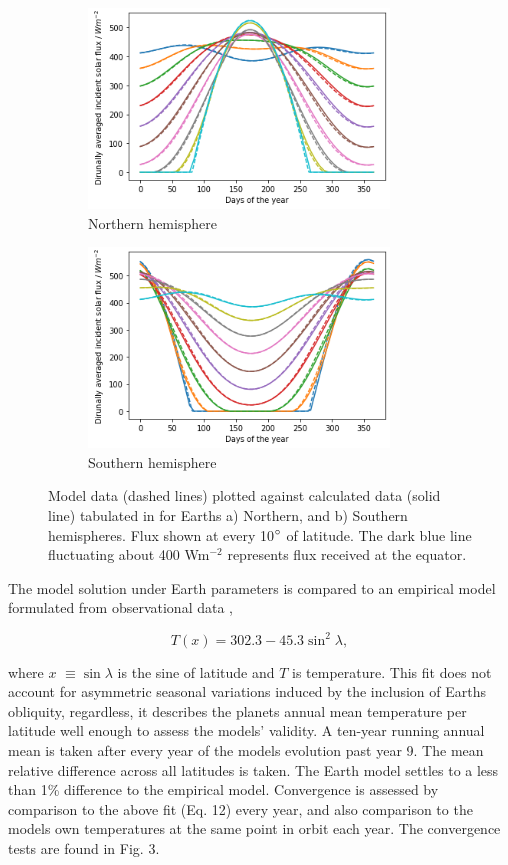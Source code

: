 \documentclass[12pt,onecolumn]{revtex4-2}    %
\begin{document}
\begin{figure}[H]
\begin{subfigure}{.5\textwidth}
  \centering
  \includegraphics[width = 8cm]{EarthNorthFlux.png}
  \caption{Northern hemisphere}
  \label{fig:sub1}
\end{subfigure}%
\begin{subfigure}{.5\textwidth}
  \centering
  \includegraphics[width=8cm]{EarthSouthFlux.png}
  \caption{Southern hemisphere}
  \label{fig:sub2}
\end{subfigure}
\raggedright
\caption{Model data (dashed lines) plotted against calculated data (solid line) tabulated in \cite{K23} for Earths a) Northern, and b) Southern hemispheres. Flux shown at every 10$\degree$ of latitude. The dark blue line fluctuating about 400 Wm$^{-2}$ represents flux received at the equator.}
\label{fig:test}
\end{figure}

The model solution under Earth parameters is compared to an empirical model formulated from observational data \cite{NC79},

\begin{equation}
T(x) = 302.3 - 45.3 \sin^{2}\lambda,
\end{equation}

where $x$ $\equiv \sin\lambda$ is the sine of latitude and $T$ is temperature. This fit does not account for asymmetric seasonal variations induced by the inclusion of Earths obliquity, regardless, it describes the planets annual mean temperature per latitude well enough to assess the models' validity. A ten-year running annual mean is taken after every year of the models evolution past year 9. The mean relative difference across all latitudes is taken. The Earth model settles to a less than 1\% difference to the empirical model. Convergence is assessed by comparison to the above fit (Eq. 12) every year, and also comparison to the models own temperatures at the same point in orbit each year. The convergence tests are found in Fig. 3.
\end{document}
